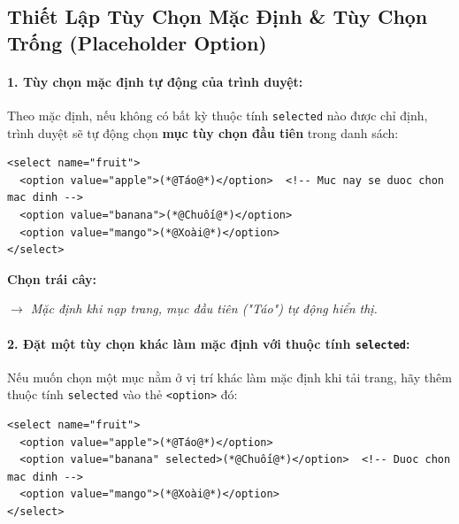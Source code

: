 \documentclass[11pt,oneside]{book}
\newcommand{\codeinline}[1]{\textcolor{accentOrange}{\texttt{#1}}}
\begin{document}
\subsection{Thiết Lập Tùy Chọn Mặc Định \& Tùy Chọn Trống (Placeholder Option)}

\paragraph{1. Tùy chọn mặc định tự động của trình duyệt:}
Theo mặc định, nếu không có bất kỳ thuộc tính \codeinline{selected} nào được chỉ định, trình duyệt sẽ tự động chọn \textbf{mục tùy chọn đầu tiên} trong danh sách:

\begin{codeWindow}
\begin{lstlisting}[language=HTML5]
<select name="fruit">
  <option value="apple">(*@Táo@*)</option>  <!-- Muc nay se duoc chon mac dinh -->
  <option value="banana">(*@Chuối@*)</option>
  <option value="mango">(*@Xoài@*)</option>
</select>
\end{lstlisting}
\end{codeWindow}

\begin{browserWindow}
\sffamily\small
\textbf{Chọn trái cây:} \par\vspace{4pt}
\tcbox[on line, arc=3pt, colback=white, colframe=primaryBlue!50, boxsep=3pt, left=8pt, right=20pt, top=3pt, bottom=3pt]{%
  \small \textcolor{black}{Táo} \;\; \textcolor{primaryBlue}{\textbf{$\boldsymbol{\vee}$}}%
} \par\vspace{4pt}
\textcolor{codeComment}{\small\textit{$\rightarrow$ Mặc định khi nạp trang, mục đầu tiên ("Táo") tự động hiển thị.}}
\end{browserWindow}

\paragraph{2. Đặt một tùy chọn khác làm mặc định với thuộc tính \codeinline{selected}:}
Nếu muốn chọn một mục nằm ở vị trí khác làm mặc định khi tải trang, hãy thêm thuộc tính \codeinline{selected} vào thẻ \codeinline{<option>} đó:

\begin{codeWindow}
\begin{lstlisting}[language=HTML5]
<select name="fruit">
  <option value="apple">(*@Táo@*)</option>
  <option value="banana" selected>(*@Chuối@*)</option>  <!-- Duoc chon mac dinh -->
  <option value="mango">(*@Xoài@*)</option>
</select>
\end{lstlisting}
\end{codeWindow}
\end{document}
